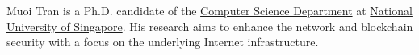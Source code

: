 








\begin{cvparagraph}

Muoi Tran is a Ph.D. candidate of the \href{http://www.comp.nus.edu.sg/about/depts/cs/}{Computer Science Department} at \href{http://nus.edu.sg/}{National University of Singapore}. 
His research aims to enhance the network and blockchain security with a focus on the underlying Internet infrastructure.




\end{cvparagraph}
